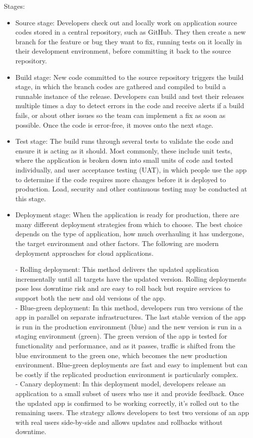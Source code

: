 \documentclass[12pt]{book}
\begin{document}
Stages:
\begin{itemize}
    \item Source stage: Developers check out and locally work on application source codes stored in a central repository, such as GitHub. They then create a new branch for the feature or bug they want to fix, running tests on it locally in their development environment, before committing it back to the source repository.
    \item Build stage: New code committed to the source repository triggers the build stage, in which the branch codes are gathered and compiled to build a runnable instance of the release. Developers can build and test their releases multiple times a day to detect errors in the code and receive alerts if a build fails, or about other issues so the team can implement a fix as soon as possible. Once the code is error-free, it moves onto the next stage.
    \item Test stage: The build runs through several tests to validate the code and ensure it is acting as it should. Most commonly, these include unit tests, where the application is broken down into small units of code and tested individually, and user acceptance testing (UAT), in which people use the app to determine if the code requires more changes before it is deployed to production. Load, security and other continuous testing may be conducted at this stage.
    \item Deployment stage: When the application is ready for production, there are many different deployment strategies from which to choose. The best choice depends on the type of application, how much overhauling it has undergone, the target environment and other factors. The following are modern deployment approaches for cloud applications. 

    - Rolling deployment: This method delivers the updated application incrementally until all targets have the updated version. Rolling deployments pose less downtime risk and are easy to roll back but require services to support both the new and old versions of the app.\\
    - Blue-green deployment: In this method, developers run two versions of the app in parallel on separate infrastructures. The last stable version of the app is run in the production environment (blue) and the new version is run in a staging environment (green). The green version of the app is tested for functionality and performance, and as it passes, traffic is shifted from the blue environment to the green one, which becomes the new production environment. Blue-green deployments are fast and easy to implement but can be costly if the replicated production environment is particularly complex.\\
    - Canary deployment: In this deployment model, developers release an application to a small subset of users who use it and provide feedback. Once the updated app is confirmed to be working correctly, it's rolled out to the remaining users. The strategy allows developers to test two versions of an app with real users side-by-side and allows updates and rollbacks without downtime.\\


\end{itemize}
\end{document}
